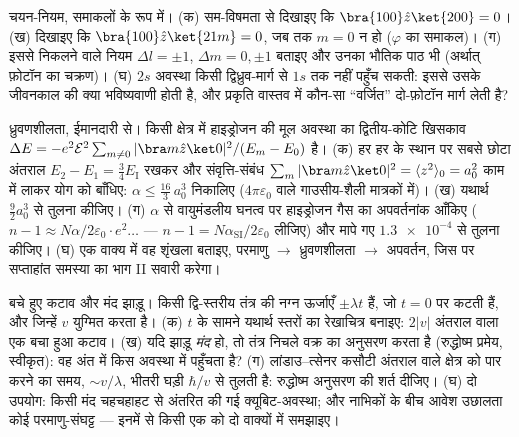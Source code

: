 \begin{exercise}[$\star\star$]\label{exo:b3:perturbation-theory:9}
चयन-नियम, समाकलों के रूप में। (क) सम-विषमता से दिखाइए कि $\bra{100}\hat z\ket{200} =
0$। (ख) दिखाइए कि $\bra{100}\hat z\ket{21m} = 0$, जब तक $m =
0$ न हो ($\varphi$ का समाकल)। (ग) इससे निकलने वाले नियम $\Delta
l = \pm1$, $\Delta m = 0, \pm1$ बताइए और उनका भौतिक पाठ भी (अर्थात्
फ़ोटॉन का चक्रण)। (घ) $2s$ अवस्था किसी द्विध्रुव-मार्ग से
$1s$ तक नहीं पहुँच सकती: इससे उसके जीवनकाल की क्या भविष्यवाणी होती है,
और प्रकृति वास्तव में कौन-सा ``वर्जित'' दो-फ़ोटॉन मार्ग लेती है?
\end{exercise}

\begin{exercise}[$\star\star\star$]\label{exo:b3:perturbation-theory:10}
ध्रुवणशीलता, ईमानदारी से। किसी क्षेत्र में हाइड्रोजन की मूल अवस्था का
द्वितीय-कोटि खिसकाव $\Delta E = -e^2\mathcal E^2\sum_{m\neq
0}|\bra m\hat z\ket 0|^2/(E_m - E_0)$ है। (क) हर हर के स्थान पर सबसे
छोटा अंतराल $E_2 - E_1 =
\tfrac34 E_{\text{I}}$ रखकर और संवृत्ति-संबंध $\sum_m|\bra
m\hat z\ket0|^2 = \langle z^2\rangle_0 = a_0^2$ काम में लाकर योग को
बाँधिए: $\alpha
\le \tfrac{16}3\,a_0^3$ निकालिए ($4\pi\varepsilon_0$ वाले
गाउसीय-शैली मात्रकों में)। (ख) यथार्थ $\tfrac92 a_0^3$ से तुलना कीजिए।
(ग) $\alpha$ से वायुमंडलीय घनत्व पर हाइड्रोजन गैस का अपवर्तनांक
आँकिए ($n - 1 \approx N\alpha/2\varepsilon_0
\cdot e^2\dots$ --- $n - 1 = N\alpha_{\text{SI}}/2
\varepsilon_0$ लीजिए) और मापे गए $\num{1.3e-4}$ से तुलना कीजिए।
(घ) एक वाक्य में वह शृंखला बताइए, परमाणु $\to$ ध्रुवणशीलता
$\to$ अपवर्तन, जिस पर सप्ताहांत समस्या का भाग II सवारी करेगा।
\end{exercise}

\begin{exercise}[$\star\star\star$]\label{exo:b3:perturbation-theory:11}
बचे हुए कटाव और मंद झाड़ू। किसी द्वि-स्तरीय तंत्र की नग्न
ऊर्जाएँ $\pm\lambda t$ हैं, जो $t = 0$ पर कटती हैं, और जिन्हें $v$
युग्मित करता है। (क) $t$ के सामने यथार्थ स्तरों का रेखाचित्र बनाइए:
$2|v|$ अंतराल वाला एक बचा हुआ कटाव। (ख) यदि झाड़ू \emph{मंद} हो, तो
तंत्र निचले वक्र का अनुसरण करता है (रुद्धोष्म प्रमेय, स्वीकृत): वह
अंत में किस अवस्था में पहुँचता है? (ग) लांडाउ--त्सेनर कसौटी अंतराल
वाले क्षेत्र को पार करने का समय, $\sim v/\lambda$, भीतरी घड़ी
$\hbar/v$ से तुलती है: रुद्धोष्म अनुसरण की शर्त दीजिए। (घ) दो
उपयोग: किसी मंद चहचहाहट से अंतरित की गई क्यूबिट-अवस्था; और नाभिकों के
बीच आवेश उछालता कोई परमाणु-संघट्ट --- इनमें से किसी एक को
दो वाक्यों में समझाइए।
\end{exercise}

